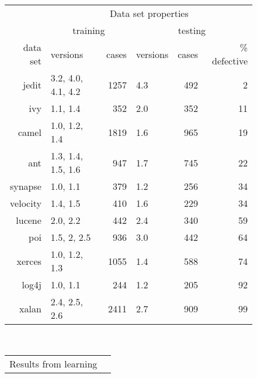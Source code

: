\begin{figure*}[!t]
	\small
	\begin{center}
		\begin{minipage}{.46\linewidth}
			\begin{tabular}{r@{~}|l@{~}|r@{~}|l@{~}|r@{~}|r@{~}|} \cline{2-6}
			 
				
				& \multicolumn{5}{c|}{ Data set  properties}\\ 
			 
				& \multicolumn{2}{c|}{training}   & \multicolumn{3}{c|}{testing}      \\ \cline{2-6}
				data set      & versions           & cases & versions     & cases    & \% defective             \\ \hline
				jedit    & 3.2, 4.0, 4.1, 4.2 & 1257      & 4.3          & 492          & 2 \\
				ivy      & 1.1, 1.4           & 352       & 2.0          & 352          & 11 \\
				camel    & 1.0, 1.2, 1.4      & 1819      & 1.6          & 965          & 19 \\
				ant      & 1.3, 1.4, 1.5, 1.6 & 947       & 1.7          & 745          & 22 \\
				synapse  & 1.0, 1.1           & 379       & 1.2          & 256          & 34 \\
				velocity & 1.4, 1.5           & 410       & 1.6          & 229          & 34 \\
				lucene   & 2.0, 2.2           & 442       & 2.4          & 340          & 59 \\
				poi      & 1.5, 2, 2.5        & 936       & 3.0          & 442          & 64 \\
			 xerces   & 1.0, 1.2, 1.3      & 1055      & 1.4          & 588          & 74  \\ 
			 log4j    & 1.0, 1.1           & 244       & 1.2          & 205          & 92   \\
			 xalan    & 2.4, 2.5, 2.6      & 2411      & 2.7          & 909          & 99  \\\hline 
				
				
			\end{tabular}\end{minipage}~~~~~~\begin{minipage}{.4\linewidth}
			\begin{tabular}{|rrr|rrr|rr|l} \cline{1-8}
			 
				\multicolumn{8}{|c|}{  Results from learning}\\
			 

\end{tabular}
\end{minipage}
\end{center}
\end{figure*}

